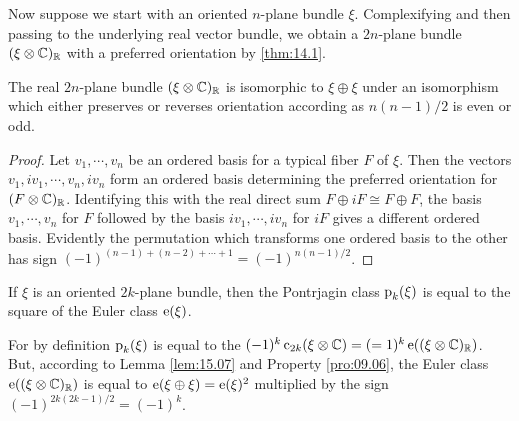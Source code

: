 \documentclass[../main]{subfiles}
\begin{document}
Now suppose we start with an oriented $n$-plane bundle $\xi$. Complexifying and then passing to the underlying real vector bundle, we obtain a $2n$-plane bundle $(\xi \otimes \mathbb C)_\mathbb R$ with a preferred orientation by \ref{thm:14.1}.
\setcounter{theorem}{6}
\begin{lemma}
\label{lem:15.07}
The real $2n$-plane bundle $(\xi \otimes \mathbb C)_\mathbb R$ is isomorphic to $\xi \oplus \xi$ under an isomorphism which either preserves or reverses orientation according as $n(n-1)/2$ is even or odd.
\end{lemma}
\begin{proof}
Let $v_1,\cdots,v_n$ be an ordered basis for a typical fiber $F$ of $\xi$. Then the vectors $v_1,iv_1,\cdots,v_n,iv_n$ form an ordered basis determining the preferred orientation for $(F\otimes \mathbb C)_\mathbb R$. Identifying this with the real direct sum $F \oplus iF \cong F \oplus F$, the basis $v_1,\cdots,v_n$ for $F$ followed by the basis $iv_1,\cdots,iv_n$ for $iF$ gives a different ordered basis. Evidently the permutation which transforms one ordered basis to the other has sign $(-1)^{(n-1) + (n-2) + \cdots + 1} = (-1)^{n(n-1)/2}$.
\end{proof}
\begin{corollary}
\label{cor:15.08}
If $\xi$ is an oriented $2k$-plane bundle, then the Pontrjagin class $\operatorname{p}_k(\xi)$ is equal to the square of the Euler class $\operatorname{e}(\xi)$.
\end{corollary}
For by definition $\operatorname{p}_k(\xi)$ is equal to the $(-1)^k \operatorname{c}_{2k}(\xi \otimes \mathbb C) = (=1)^k \operatorname{e}((\xi \otimes \mathbb C)_\mathbb R)$. But, according to Lemma \ref{lem:15.07} and Property \ref{pro:09.06}, the Euler class $\operatorname{e}((\xi \otimes \mathbb C)_\mathbb R)$ is equal to $\operatorname{e}(\xi \oplus \xi) = \operatorname{e}(\xi)^2$ multiplied by the sign $(-1)^{2k(2k-1)/2} = (-1)^k$.
\end{document}
